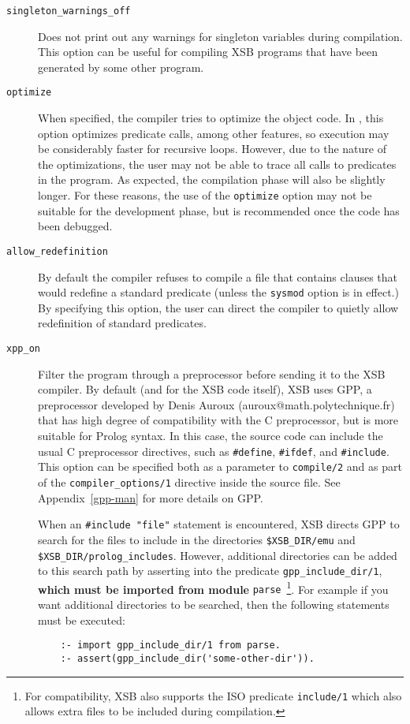\begin{description}
\item[{\tt singleton\_warnings\_off}] Does not print out any warnings
  for singleton variables during compilation.  This option can be
  useful for compiling XSB programs that have been generated by some
  other program.
%
\item[{\tt optimize}] When specified, the
  compiler tries to optimize the object code.  In \version, this
  option optimizes predicate calls, among other features, so execution
  may be considerably faster for recursive loops.  However, due to the
  nature of the optimizations, the user may not be able to trace all
  calls to predicates in the program.  As expected, the compilation
  phase will also be slightly longer.  For these reasons, the use of
  the {\tt optimize} option may not be suitable for the development
  phase, but is recommended once the code has been debugged.
%
\item[{\tt allow\_redefinition}] 
	By default the compiler refuses to compile a file that
	contains clauses that would redefine a standard predicate
	(unless the {\tt sysmod} option is in effect.)  By specifying
	this option, the user can direct the compiler to quietly allow
	redefinition of standard predicates.
%
\item[{\tt xpp\_on}] Filter the program through a
  preprocessor before sending it to the XSB compiler. By default (and
  for the XSB code itself), XSB uses GPP, a preprocessor developed by
  Denis Auroux (auroux@math.polytechnique.fr) that has high degree of
  compatibility with the C preprocessor, but is more suitable for
  Prolog syntax. In this case, the source code can include the usual C
  preprocessor directives, such as \verb|#define|, \verb|#ifdef|, and
  \verb|#include|. This option can be specified both as a parameter to
       {\tt compile/2} and as part of the {\tt compiler\_options/1}
       directive inside the source file. See Appendix~\ref{gpp-man}
       for more details on GPP.

  When an \verb|#include "file"| statement is encountered, XSB directs
  GPP to search for the files to include in the
  directories \verb|$XSB_DIR/emu| and
  \verb|$XSB_DIR/prolog_includes|. 
  However, additional directories can be added to this search path by
  asserting into the predicate \verb|gpp_include_dir/1|, {\bf which
    must be imported from module} {\tt parse}~\footnote{For
    compatibility, XSB also supports the ISO predicate {\tt include/1}
    which also allows extra files to be included during compilation.}.
%  
  For example if you want additional directories to be searched, then
  the following statements must be executed:
\begin{verbatim}
    :- import gpp_include_dir/1 from parse.
    :- assert(gpp_include_dir('some-other-dir')).
\end{verbatim}


\end{description}
